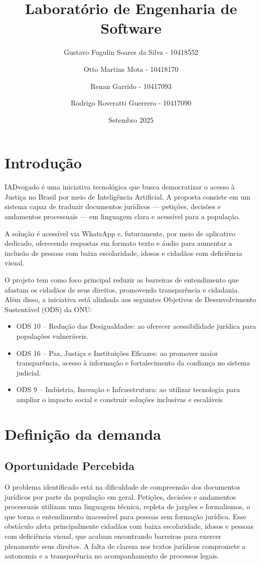 \documentclass{article}
\title{Laboratório de Engenharia de Software}
\date{Setembro 2025}
\author{Gustavo Fugulin Soares da Silva - 10418552 \and 
Otto Martins Mota - 10418170 \and
Renan Garrido - 10417093 \and
Rodrigo Roveratti Guerrero - 10417090}
\begin{document}
\maketitle
\newpage


\tableofcontents

\newpage



\section{Introdução}
IADvogado é uma iniciativa tecnológica que busca democratizar o acesso à Justiça no Brasil por meio de Inteligência Artificial. A proposta consiste em um sistema capaz de traduzir documentos jurídicos — petições, decisões e andamentos processuais — em linguagem clara e acessível para a população.

A solução é acessível via WhatsApp e, futuramente, por meio de aplicativo dedicado, oferecendo respostas em formato texto e áudio para aumentar a inclusão de pessoas com baixa escolaridade, idosos e cidadãos com deficiência visual.

O projeto tem como foco principal reduzir as barreiras de entendimento que afastam os cidadãos de seus direitos, promovendo transparência e cidadania. Além disso, a iniciativa está alinhada aos seguintes Objetivos de Desenvolvimento Sustentável (ODS) da ONU:
\begin{itemize}
    \item ODS 10 – Redução das Desigualdades: ao oferecer acessibilidade jurídica para populações vulneráveis.
    \item ODS 16 – Paz, Justiça e Instituições Eficazes: ao promover maior transparência, acesso à informação e fortalecimento da confiança no sistema judicial.
    \item ODS 9 – Indústria, Inovação e Infraestrutura: ao utilizar tecnologia para ampliar o impacto social e construir soluções inclusivas e escaláveis
\end{itemize}

\section{Definição da demanda}
    \subsection{Oportunidade Percebida}
    O problema identificado está na dificuldade de compreensão dos documentos jurídicos por parte da população em geral. Petições, decisões e andamentos processuais utilizam uma linguagem técnica, repleta de jargões e formalismos, o que torna o entendimento inacessível para pessoas sem formação jurídica. Esse obstáculo afeta principalmente cidadãos com baixa escolaridade, idosos e pessoas com deficiência visual, que acabam encontrando barreiras para exercer plenamente seus direitos. A falta de clareza nos textos jurídicos compromete a autonomia e a transparência no acompanhamento de processos legais.
\end{document}
